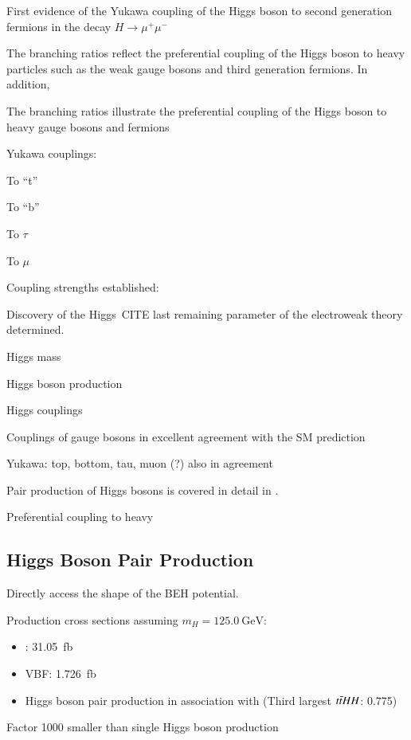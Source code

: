 First evidence of the Yukawa coupling of the Higgs boson to second generation
fermions in the decay $H \to \mu^+ \mu^-$











The branching ratios reflect the preferential coupling of the Higgs boson to
heavy particles such as the weak gauge bosons and third generation fermions. In
addition,

The branching ratios illustrate the preferential coupling of the Higgs boson to
heavy gauge bosons and fermions



Yukawa couplings:

To ``t''

To ``b''

To $\tau$

To $\mu$


Coupling strengths established:


Discovery of the Higgs~CITE last remaining parameter of the electroweak theory
determined.


Higgs mass

Higgs boson production

Higgs couplings


Couplings of gauge bosons in excellent agreement with the SM prediction

Yukawa: top, bottom, tau, muon (?) also in agreement





Pair production of Higgs bosons is covered in detail in
.




Preferential coupling to heavy




\subsection{Higgs Boson Pair Production}
\label{fig:theory_higgs_pair_prod}

Directly access the shape of the BEH potential.

Production cross sections assuming $m_{H} = \SI{125.0}{\GeV}$:
\begin{itemize}
\item \ggF: \SI{31.05}{\femto\barn}~\cite{Grazzini:2018bsd}
\item VBF: \SI{1.726}{\femto\barn}~\cite{Dreyer:2018qbw,LHCHWGHH}
\item Higgs boson pair production in association with \ttbar (Third largest
  $t\bar{t} HH$: \SI{0.775}{})
\end{itemize}
Factor 1000 smaller than single Higgs boson production

